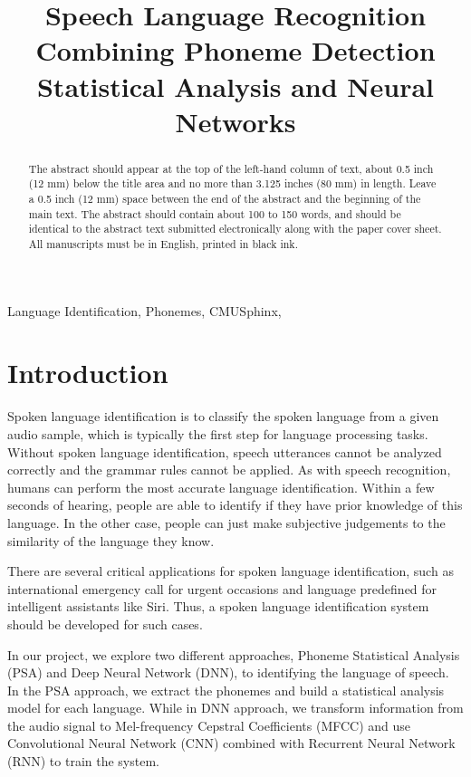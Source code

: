 \documentclass{article}
\title{Speech Language Recognition Combining Phoneme Detection Statistical Analysis and Neural Networks}
\begin{document}
%
\maketitle
%
\begin{abstract}
The abstract should appear at the top of the left-hand column of text, about
0.5 inch (12 mm) below the title area and no more than 3.125 inches (80 mm) in
length.  Leave a 0.5 inch (12 mm) space between the end of the abstract and the
beginning of the main text.  The abstract should contain about 100 to 150
words, and should be identical to the abstract text submitted electronically
along with the paper cover sheet.  All manuscripts must be in English, printed
in black ink.
\end{abstract}
%
\begin{keywords}
Language Identification, Phonemes, CMUSphinx,
\end{keywords}
%
\section{Introduction}
\label{sec:intro}
Spoken language identification is to classify the spoken language from a given audio sample, which is typically the first step for language processing tasks. Without spoken language identification, speech utterances cannot be analyzed correctly and the grammar rules cannot be applied. As with speech recognition, humans can perform the most accurate language identification.\cite{shi2006importance} Within a few seconds of hearing, people are able to identify if they have prior knowledge of this language. In the other case, people can just make subjective judgements to the similarity of the language they know.

There are several critical applications for spoken language identification, such as international emergency call for urgent occasions and language predefined for intelligent assistants like Siri. 
Thus, a spoken language identification system should be developed for such cases.

In our project, we explore two different approaches, Phoneme Statistical Analysis (PSA) and Deep Neural Network (DNN), to identifying the language of speech. In the PSA approach, we extract the phonemes and build a statistical analysis model for each language. While in DNN approach, we transform information from the audio signal to Mel-frequency Cepstral Coefficients (MFCC) and use Convolutional Neural Network (CNN) combined with Recurrent Neural Network (RNN) to train the system.
\end{document}

